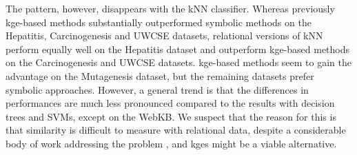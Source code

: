 The pattern, however, disappears with the kNN classifier.
Whereas previously \gls{kge}-based methods substantially outperformed symbolic methods on the Hepatitis, Carcinogenesis and UWCSE datasets, relational versions of kNN perform equally well on the Hepatitis dataset and outperform \gls{kge}-based methods on the Carcinogenesis and UWCSE datasets.
\gls{kge}-based methods seem to gain the advantage on the Mutagenesis dataset, but the remaining datasets prefer symbolic approaches.
However, a general trend is that the differences in performances are much less pronounced compared to the results with decision trees and SVMs, except on the WebKB.
We suspect that the reason for this is that similarity is difficult to measure with relational data, despite a considerable body of work addressing the problem \cite{Dumancic2017a}, and \gls{kge}s might be a viable alternative.



